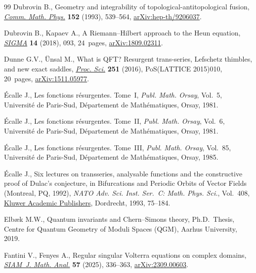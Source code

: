 \begin{thebibliography}{99}
Dubrovin B., Geometry and integrability of topological-antitopological fusion,
 \href{https://doi.org/10.1007/BF02096618}{\textit{Comm. Math. Phys.}}
 \textbf{152} (1993), 539--564,
 \href{http://arxiv.org/abs/hep-th/9206037}{arXiv:hep-th/9206037}.

Dubrovin B., Kapaev A., A {R}iemann--{H}ilbert approach to the {H}eun equation,
 \href{https://doi.org/10.3842/SIGMA.2018.093}{\textit{SIGMA}} \textbf{14}
 (2018), 093, 24~pages,
 \href{http://arxiv.org/abs/1809.02311}{arXiv:1809.02311}.

Dunne G.V., \"Unsal M., What is QFT? Resurgent trans-series, Lefschetz
 thimbles, and new exact saddles,
 \href{https://doi.org/10.22323/1.251.0010}{\textit{Proc. Sci.}} \textbf{251}
 (2016), PoS(LATTICE 2015)010, 20~pages,
 \href{http://arxiv.org/abs/1511.05977}{arXiv:1511.05977}.

{\'E}calle J., Les fonctions r\'esurgentes. {T}ome~{I}, \textit{Publ. Math.
 Orsay}, Vol.~5, Universit\'e de Paris-Sud, D\'epartement de Math\'ematiques,
 Orsay, 1981.

{\'E}calle J., Les fonctions r\'esurgentes. {T}ome~{II}, \textit{Publ. Math.
 Orsay}, Vol.~6, Universit\'e de Paris-Sud, D\'epartement de Math\'ematiques,
 Orsay, 1981.

{\'E}calle J., Les fonctions r\'esurgentes. {T}ome~{III}, \textit{Publ. Math.
 Orsay}, Vol.~85, Universit\'e de Paris-Sud, D\'epartement de Math\'ematiques,
 Orsay, 1985.

{\'E}calle J., Six lectures on transseries, analysable functions and the
 constructive proof of {D}ulac's conjecture, in Bifurcations and {P}eriodic
 {O}rbits of {V}ector {F}ields ({M}ontreal, {PQ}, 1992), \textit{NATO Adv.
 Sci. Inst. Ser.~C: Math. Phys. Sci.}, Vol.~408,
 \href{https://doi.org/10.1007/978-94-015-8238-4_3}{Kluwer Academic
 Publishers}, Dordrecht, 1993, 75--184.

Elb{\ae}k M.W., Quantum invariants and {C}hern--{S}imons theory, Ph.D.~Thesis,
 {C}entre for Quantum Geometry of Moduli Spaces (QGM), Aarhus University,
 2019.

Fantini V., Fenyes A., Regular singular {V}olterra equations on complex
 domains, \href{https://doi.org/10.1137/23M1613876}{\textit{SIAM~J. Math.
 Anal.}} \textbf{57} (2025), 336--363,
 \href{http://arxiv.org/abs/2309.00603}{arXiv:2309.00603}.


\end{thebibliography}

